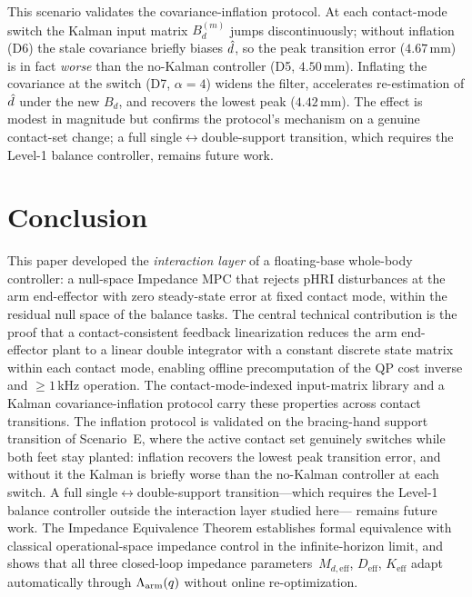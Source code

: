 This scenario validates the covariance-inflation protocol. At each contact-mode
switch the Kalman input matrix $B_d^{(m)}$ jumps discontinuously; without
inflation (D6) the stale covariance briefly biases $\hat{d}$, so the peak
transition error ($4.67$\,mm) is in fact \emph{worse} than the no-Kalman
controller (D5, $4.50$\,mm). Inflating the covariance at the switch
(D7, $\alpha=4$) widens the filter, accelerates re-estimation of $\hat{d}$ under
the new $B_d$, and recovers the lowest peak ($4.42$\,mm). The effect is modest
in magnitude but confirms the protocol's mechanism on a genuine contact-set
change; a full single$\leftrightarrow$double-support transition, which requires
the Level-1 balance controller, remains future work.

\section{Conclusion}\label{sec:conclusion}

This paper developed the \emph{interaction layer} of a floating-base
whole-body controller: a null-space Impedance MPC that rejects pHRI
disturbances at the arm end-effector with zero steady-state error at fixed
contact mode, within the residual null space of the balance tasks.
The central technical contribution is the proof that a contact-consistent
feedback linearization reduces the arm end-effector plant to a linear double
integrator with a constant discrete state matrix within each contact mode,
enabling offline precomputation of the QP cost inverse and ${\geq}1$\,kHz
operation.
The contact-mode-indexed input-matrix library and a Kalman
covariance-inflation protocol carry these properties across contact
transitions. The inflation protocol is validated on the bracing-hand support
transition of Scenario~E, where the active contact set genuinely switches while
both feet stay planted: inflation recovers the lowest peak transition error,
and without it the Kalman is briefly worse than the no-Kalman controller at each
switch. A full single$\leftrightarrow$double-support transition---which requires
the Level-1 balance controller outside the interaction layer studied here---
remains future work.
The Impedance Equivalence Theorem establishes formal equivalence with
classical operational-space impedance control in the infinite-horizon limit,
and shows that all three closed-loop impedance parameters~$M_{d,\text{eff}}$,
$D_{\text{eff}}$, $K_{\text{eff}}$ adapt automatically through
$\Lambda_{\text{arm}}(q)$ without online re-optimization.

